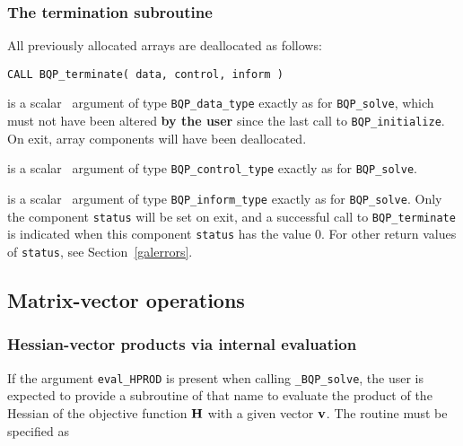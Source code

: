 \documentclass{galahad}
\newcommand{\packagename}{BQP}
\newcommand{\fullpackagename}{\libraryname\_\packagename}
\newcommand{\solver}{{\tt \fullpackagename\_solve}}
\begin{document}
\subsubsection{The  termination subroutine}
All previously allocated arrays are deallocated as follows:
\vspace*{1mm}

\hspace{8mm}
{\tt CALL \packagename\_terminate( data, control, inform )}

\vspace*{-3mm}
\begin{description}

 is a scalar \intentinout\ argument of type 
{\tt \packagename\_data\_type} 
exactly as for
{\tt \packagename\_solve},
which must not have been altered {\bf by the user} since the last call to 
{\tt \packagename\_initialize}.
On exit, array components will have been deallocated.

 is a scalar \intentin\ argument of type 
{\tt \packagename\_control\_type}
exactly as for
{\tt \packagename\_solve}.

 is a scalar \intentout\ argument of type
{\tt \packagename\_inform\_type}
exactly as for
{\tt \packagename\_solve}.
Only the component {\tt status} will be set on exit, and a 
successful call to 
{\tt \packagename\_terminate}
is indicated when this  component {\tt status} has the value 0. 
For other return values of {\tt status}, see Section~\ref{galerrors}.

\end{description}



\subsection{Matrix-vector operations\label{fdv}}


\subsubsection{Hessian-vector products via internal evaluation\label{prodfv}}

If the argument {\tt eval\_HPROD} is present when calling \solver, the
user is expected to provide a subroutine of that name to evaluate the
product of the Hessian of the objective function ${\mathbf{H}}$
with a given vector ${\mathbf{v}}$.
The routine must be specified as
\end{document}
